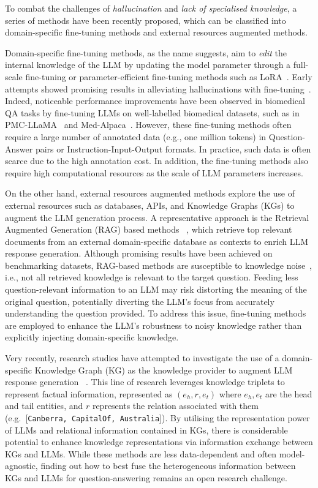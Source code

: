 To combat the challenges of \emph{hallucination} and \emph{lack of specialised knowledge}, a series of methods have been recently proposed, which can be classified into domain-specific fine-tuning methods and external resources augmented methods.

Domain-specific fine-tuning methods, as the name suggests, aim to \emph{edit} the internal knowledge of the LLM by updating the model parameter through a full-scale fine-tuning or parameter-efficient fine-tuning methods such as LoRA~\parencite{lora}.
Early attempts showed promising results in alleviating hallucinations with fine-tuning~\parencite{wei2021finetuned}. Indeed, noticeable performance improvements have been observed in biomedical QA tasks by fine-tuning LLMs on well-labelled biomedical datasets, such as in PMC-LLaMA~\parencite{pmc-llama} and Med-Alpaca~\parencite{medalpaca}.
However, these fine-tuning methods often require a large number of annotated data (e.g., one million tokens) in Question-Answer pairs or Instruction-Input-Output formats. In practice, such data is often scarce due to the high annotation cost. 
In addition, the fine-tuning methods also require high computational resources as the scale of LLM parameters increases.

On the other hand, external resources augmented methods explore the use of external resources such as databases, APIs, and Knowledge Graphs (KGs) to augment the LLM generation process. 
A representative approach is the Retrieval Augmented Generation (RAG) based methods ~\parencite{rag, paperqa, rqrag}, which retrieve top relevant documents from an external domain-specific database as contexts to enrich LLM response generation. Although promising results have been achieved on benchmarking datasets, RAG-based methods are susceptible to knowledge noise~\parencite{kbert}, i.e., not all retrieved knowledge is relevant to the target question. Feeding less question-relevant information to an LLM may risk distorting the meaning of the original question, potentially diverting the LLM's focus from accurately understanding the question provided. To address this issue, fine-tuning methods are employed to enhance the LLM's robustness to noisy knowledge
rather than explicitly injecting domain-specific knowledge. 

Very recently, research studies have attempted to investigate the use of a domain-specific Knowledge Graph (KG) as the knowledge
provider to augment LLM response generation ~\parencite{gnp, graph-prompter, kalm-prompting}.
This line of research leverages knowledge triplets to represent factual information, represented as $(e_h, r, e_t)$ where $e_h, e_t$ are the head and tail entities, and $r$ represents the relation associated with them (e.g.\ [\texttt{Canberra, CapitalOf, Australia}]).
By utilising the representation power of LLMs and relational information contained in KGs, there is considerable potential to enhance knowledge representations via information exchange between KGs and LLMs.
While these methods are less data-dependent and often model-agnostic, finding out how to best fuse the heterogeneous information between KGs and LLMs for question-answering remains an open research challenge.

